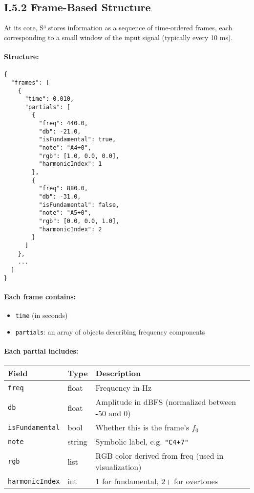 \subsection*{I.5.2 Frame-Based Structure}

At its core, S³ stores information as a sequence of time-ordered frames, each corresponding to a small window of the input signal (typically every 10 ms).

\paragraph{Structure:}
\begin{verbatim}
{
  "frames": [
    {
      "time": 0.010,
      "partials": [
        {
          "freq": 440.0,
          "db": -21.0,
          "isFundamental": true,
          "note": "A4+0",
          "rgb": [1.0, 0.0, 0.0],
          "harmonicIndex": 1
        },
        {
          "freq": 880.0,
          "db": -31.0,
          "isFundamental": false,
          "note": "A5+0",
          "rgb": [0.0, 0.0, 1.0],
          "harmonicIndex": 2
        }
      ]
    },
    ...
  ]
}
\end{verbatim}

\paragraph{Each frame contains:}
\begin{itemize}
    \item \texttt{time} (in seconds)
    \item \texttt{partials}: an array of objects describing frequency components
\end{itemize}

\paragraph{Each partial includes:}

\begin{center}
\begin{tabular}{|l|l|p{8cm}|}
\hline
\textbf{Field} & \textbf{Type} & \textbf{Description} \\
\hline
\texttt{freq} & float & Frequency in Hz \\
\texttt{db} & float & Amplitude in dBFS (normalized between -50 and 0) \\
\texttt{isFundamental} & bool & Whether this is the frame’s $f_0$ \\
\texttt{note} & string & Symbolic label, e.g. \texttt{"C4+7"} \\
\texttt{rgb} & list & RGB color derived from freq (used in visualization) \\
\texttt{harmonicIndex} & int & 1 for fundamental, 2+ for overtones \\
\hline
\end{tabular}
\end{center}

